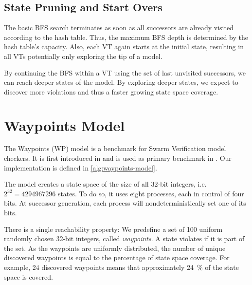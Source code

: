 \documentclass[
fancyheadings, %
%
%
]{stsreprt}
\begin{document}
\subsection{State Pruning and Start Overs}
\label{section:theory:state-pruning}


The basic BFS search terminates as soon as all successors are already visited according to the hash table.
Thus, the maximum BFS depth is determined by the hash table's capacity.
Also, each VT again starts at the initial state, resulting in all VTs potentially only exploring the tip of a model.

By continuing the BFS within a VT using the set of last unvisited successors, we can reach deeper states of the model.
By exploring deeper states, we expect to discover more violations and thus a faster growing state space coverage.

\section{Waypoints Model}
\label{section:theory:waypoints-model}

The Waypoints (WP) model is a benchmark for Swarm Verification model checkers.
It is first introduced in \cite{Holzmann2011.Swarm-Verification-Techniques} and is used as primary benchmark in \cite{DeFrancisco2020.Grapple}.
Our implementation is defined in \cref{alg:waypoints-model}.

The model creates a state space of the size of all 32-bit integers, i.e. $2^{32}=\num{4294967296}$ states.
To do so, it uses eight processes, each in control of four bits.
At successor generation, each process will nondeterministically set one of its bits.

There is a single reachability property:
We predefine a set of 100 uniform randomly chosen 32-bit integers, called \emph{waypoints}.
A state violates if it is part of the set.
As the waypoints are uniformly distributed, the number of unique discovered waypoints is equal to the percentage of state space coverage.
For example, 24 discovered waypoints means that approximately \SI{24}{\percent} of the state space is covered.
\end{document}

